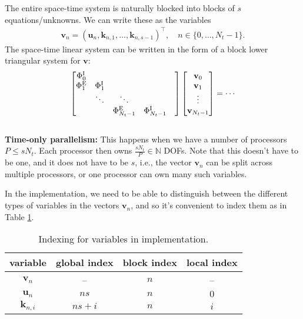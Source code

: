 \documentclass[a4paper,10pt]{article}
\begin{document}
The entire space-time system is naturally blocked into blocks of $s$ equations/unknowns. We can write these as the variables
\begin{align}
\mathbf{v}_n = (\mathbf{u}_n, \mathbf{k}_{n,1}, \ldots, \mathbf{k}_{n,s-1})^\top, \quad n \in \{0,\ldots,N_t-1\}.
\end{align}
The space-time linear system can be written in the form of a block lower triangular system for $\mathbf{v}$:
\begin{align}
\begin{bmatrix}
\Phi^{\rm I}_0 & \\
\Phi^{\rm E}_1 & \Phi^{\rm I}_1 &  \\
					& \ddots & \ddots \\
					& 				& \Phi^{\rm E}_{N_t-1} & \Phi^{\rm I}_{N_t-1} &  \\
\end{bmatrix}
\begin{bmatrix}
\mathbf{v}_{0} \\
\mathbf{v}_{1} \\ 
\vdots \\
\mathbf{v}_{N_t-1} \\
\end{bmatrix}
= \cdots
\end{align} \\

\noindent \textbf{Time-only parallelism:}  This happens when we have a number of processors $P \leq s N_t$. Each processor then owns $\frac{s N_t}{P} \in \mathbb{N}$ DOFs. Note that this doesn't have to be one, and it does not have to be $s$, i.e., the vector $\mathbf{v}_n$ can be split across multiple processors, or one processor can own many such variables. 

In the implementation, we need to be able to distinguish between the different types of variables in the vectors $\mathbf{v}_n$, and so it's convenient to index them as in Table \ref{tab:variable_inds}.
\begin{table}[h]
\caption{Indexing for variables in implementation. \label{tab:variable_inds}}
\centering
\begin{tabular}{c|c|c|c}
variable & global index & block index & local index \\ \hline 
$\mathbf{v}_n$ & -- & $n$ & --  \\
$\mathbf{u}_n$ & $ns$ & $n$ & $0$  \\
$\mathbf{k}_{n,i}$ & $ns+i$ & $n$ & $i$  \\ 
\end{tabular}
\end{table}
\end{document}
